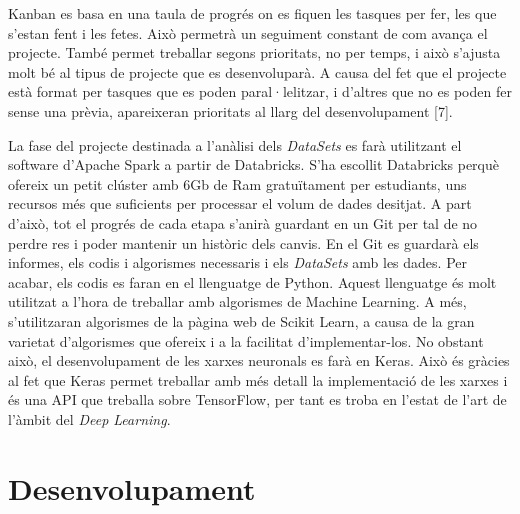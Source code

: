 \documentclass[10pt,a4paper,twocolumn,twoside]{article}
\begin{document}
Kanban es basa en una taula de progrés on es fiquen les tasques per fer, les que s'estan fent i les fetes. Això permetrà un seguiment constant de com avança el projecte. També permet treballar segons prioritats, no per temps, i això s'ajusta molt bé al tipus de projecte que es desenvoluparà. A causa del fet que el projecte està format per tasques que es poden paral·lelitzar, i d'altres que no es poden fer sense una prèvia, apareixeran prioritats al llarg del desenvolupament [7].

La fase del projecte destinada a l'anàlisi dels \textit{DataSets} es farà utilitzant el software d'Apache Spark a partir de Databricks. S'ha escollit Databricks perquè ofereix un petit clúster amb 6Gb de Ram gratuïtament per estudiants, uns recursos més que suficients per processar el volum de dades desitjat.
A part d'això, tot el progrés de cada etapa s'anirà guardant en un Git per tal de no perdre res i poder mantenir un històric dels canvis. En el Git es guardarà els informes, els codis i algorismes necessaris i els \textit{DataSets} amb les dades.
Per acabar, els codis es faran en el llenguatge de Python. Aquest llenguatge és molt utilitzat a l'hora de treballar amb algorismes de Machine Learning. A més, s'utilitzaran algorismes de la pàgina web de Scikit Learn, a causa de la gran varietat d'algorismes que ofereix i a la facilitat d'implementar-los. No obstant això, el desenvolupament de les xarxes neuronals es farà en Keras. Això és gràcies al fet que Keras permet treballar amb més detall la implementació de les xarxes i és una API que treballa sobre TensorFlow, per tant es troba en l'estat de l'art de l'àmbit del \textit{Deep Learning}.
\section {Desenvolupament}
\end{document}
